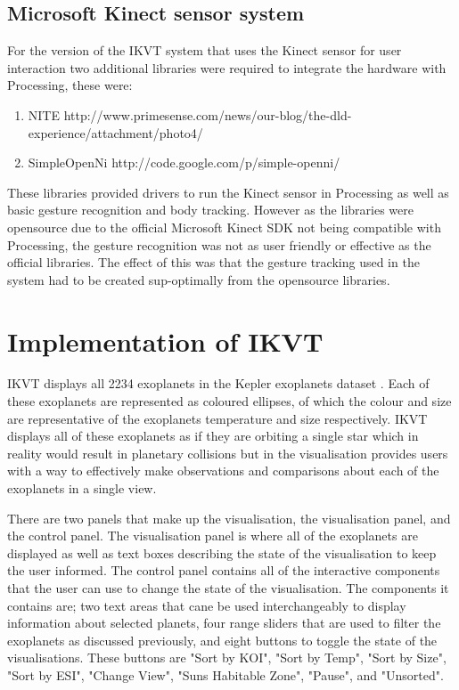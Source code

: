 \subsection{Microsoft Kinect sensor system}
For the version of the IKVT system that uses the Kinect sensor for user
interaction two additional libraries were required to integrate the hardware
with Processing, these were:
\begin{enumerate}
 \item NITE
http://www.primesense.com/news/our-blog/the-dld-experience/attachment/photo4/~
 \item SimpleOpenNi http://code.google.com/p/simple-openni/~
\end{enumerate}
These libraries provided drivers to run the Kinect sensor in Processing as well
as basic gesture recognition and body tracking. However as the libraries were
opensource due to the official Microsoft Kinect SDK not being compatible with
Processing, the gesture recognition was not as user friendly or effective as the
official libraries. The effect of this was that the gesture tracking used in the
system had to be created sup-optimally from the opensource libraries. 

\section{Implementation of IKVT}

IKVT displays all 2234 exoplanets
in the Kepler exoplanets dataset \cite{dataset}. Each of these exoplanets are
represented as coloured
ellipses, of which the colour and size are representative of the exoplanets
temperature and size respectively. IKVT displays all of these exoplanets as if
they are orbiting a single star which in reality would result in planetary
collisions but in the visualisation provides users with a way to effectively
make observations and comparisons about each of the exoplanets in a single
view. 

There are two panels that make up the visualisation, the visualisation panel,
and the control panel. The visualisation panel is where all of the exoplanets
are displayed as well as text boxes describing the state of the visualisation to
keep the user informed. The control panel contains all of the interactive
components that the user can use to change the state of the visualisation. The
components it contains are; two text areas that cane be used interchangeably to
display information about selected planets, four range sliders that are used to
filter the exoplanets as discussed previously, and eight buttons to toggle the
state of the visualisations. These buttons are "Sort by KOI", "Sort by Temp",
"Sort by Size", "Sort by ESI", "Change View", "Suns Habitable Zone", "Pause",
and "Unsorted". ~


